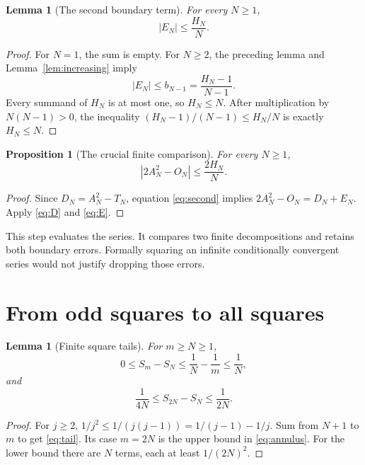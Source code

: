 \documentclass[11pt,a4paper]{article}
\newtheorem{lemma}[theorem]{Lemma}
\newtheorem{proposition}[theorem]{Proposition}
\theoremstyle{remark}\newtheorem{remark}[theorem]{Remark}
\newcommand{\abs}[1]{\left|#1\right|}
\begin{document}
\begin{lemma}[The second boundary term]\label{lem:E}
For every $N\ge1$,
\begin{equation}\label{eq:E}
 \abs{E_N}\le\frac{H_N}{N}.
\end{equation}
\end{lemma}
\begin{proof}
For $N=1$, the sum is empty. For $N\ge2$, the preceding lemma and
Lemma~\ref{lem:increasing} imply
\[
 \abs{E_N}\le b_{N-1}=\frac{H_N-1}{N-1}.
\]
Every summand of $H_N$ is at most one, so $H_N\le N$.
After multiplication by $N(N-1)>0$, the inequality
$(H_N-1)/(N-1)\le H_N/N$ is exactly $H_N\le N$.
\end{proof}

\begin{proposition}[The crucial finite comparison]\label{prop:core}
For every $N\ge1$,
\begin{equation}\label{eq:core}
 \boxed{\displaystyle\abs{2A_N^2-O_N}\le\frac{2H_N}{N}.}
\end{equation}
\end{proposition}
\begin{proof}
Since $D_N=A_N^2-T_N$, equation \eqref{eq:second} implies
$2A_N^2-O_N=D_N+E_N$. Apply \eqref{eq:D} and \eqref{eq:E}.
\end{proof}

This step evaluates the series. It compares two finite decompositions
and retains both boundary errors. Formally squaring an infinite
conditionally convergent series would not justify dropping those
errors.

\section{From odd squares to all squares}\label{sec:allsquares}

\begin{lemma}[Finite square tails]\label{lem:tail}
For $m\ge N\ge1$,
\begin{equation}\label{eq:tail}
 0\le S_m-S_N\le\frac1N-\frac1m\le\frac1N,
\end{equation}
and
\begin{equation}\label{eq:annulus}
 \frac1{4N}\le S_{2N}-S_N\le\frac1{2N}.
\end{equation}
\end{lemma}
\begin{proof}
For $j\ge2$,
$1/j^2\le1/(j(j-1))=1/(j-1)-1/j$.
Sum from $N+1$ to $m$ to get \eqref{eq:tail}.
Its case $m=2N$ is the upper bound in \eqref{eq:annulus}.
For the lower bound there are $N$ terms, each at least
$1/(2N)^2$.
\end{proof}
\end{document}
